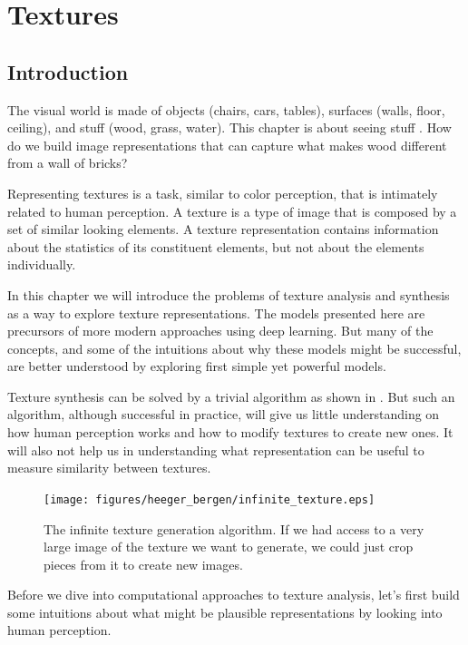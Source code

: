 \chapter{Textures}
\label{chap:textures}

\section{Introduction}

The visual world is made of objects (chairs, cars, tables), surfaces (walls, floor, ceiling), and stuff (wood, grass, water). This chapter is about seeing stuff \cite{Adelson2001}. How do we build image representations that can capture what makes wood different from a wall of bricks? 

Representing textures is a task, similar to color perception, that is intimately related to human perception. A texture is a type of image that is composed by a set of similar looking elements. A texture representation contains information about the statistics of its constituent elements, but not about the elements individually. 



In this chapter we will introduce the problems of texture analysis and synthesis as a way to explore texture representations. The models presented here are precursors of more modern approaches using deep learning. But many of the concepts, and some of the intuitions about why these models might be successful, are better understood by exploring first simple yet powerful models. 

Texture synthesis can be solved by a trivial algorithm as shown in \fig{\ref{fig:infinite_texture}}. But such an algorithm, although successful in practice, will give us little understanding on how human perception works and how to modify textures to create new ones. It will also not help us in understanding what representation can be useful to measure similarity between textures. 

\begin{figure}
\centerline{
\texttt{[image: figures/heeger\_bergen/infinite\_texture.eps]}
}
\caption{The infinite texture generation algorithm. If we had access to a very large image of the texture we want to generate, we could just crop pieces from it to create new images.  
}
\label{fig:infinite_texture}
\end{figure}


Before we dive into computational approaches to texture analysis, let's first build some intuitions about what might be plausible representations by looking into human perception. 




